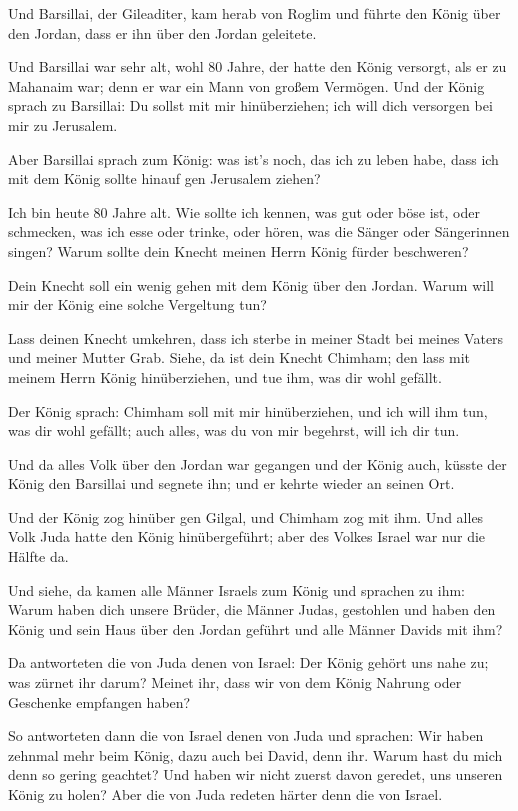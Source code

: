 Und Barsillai, der Gileaditer, kam herab von Roglim und
führte den König über den Jordan, dass er ihn über den Jordan geleitete.

 Und Barsillai war sehr alt, wohl 80 Jahre, der hatte den
König versorgt, als er zu Mahanaim war; denn er war ein Mann von großem
Vermögen.  Und der König sprach zu Barsillai: Du sollst
mit mir hinüberziehen; ich will dich versorgen bei mir zu Jerusalem.

 Aber Barsillai sprach zum König: was ist's noch, das ich
zu leben habe, dass ich mit dem König sollte hinauf gen Jerusalem
ziehen?

 Ich bin heute 80 Jahre alt. Wie sollte ich kennen, was
gut oder böse ist, oder schmecken, was ich esse oder trinke, oder hören,
was die Sänger oder Sängerinnen singen? Warum sollte dein Knecht meinen
Herrn König fürder beschweren?

 Dein Knecht soll ein wenig gehen mit dem König über den
Jordan. Warum will mir der König eine solche Vergeltung tun?

 Lass deinen Knecht umkehren, dass ich sterbe in meiner
Stadt bei meines Vaters und meiner Mutter Grab. Siehe, da ist dein
Knecht Chimham; den lass mit meinem Herrn König hinüberziehen, und tue
ihm, was dir wohl gefällt.

 Der König sprach: Chimham soll mit mir hinüberziehen,
und ich will ihm tun, was dir wohl gefällt; auch alles, was du von mir
begehrst, will ich dir tun.

 Und da alles Volk über den Jordan war gegangen und der
König auch, küsste der König den Barsillai und segnete ihn; und er
kehrte wieder an seinen Ort.

 Und der König zog hinüber gen Gilgal, und Chimham zog
mit ihm. Und alles Volk Juda hatte den König hinübergeführt; aber des
Volkes Israel war nur die Hälfte da.

 Und siehe, da kamen alle Männer Israels zum König und
sprachen zu ihm: Warum haben dich unsere Brüder, die Männer Judas,
gestohlen und haben den König und sein Haus über den Jordan geführt und
alle Männer Davids mit ihm?

 Da antworteten die von Juda denen von Israel: Der König
gehört uns nahe zu; was zürnet ihr darum? Meinet ihr, dass wir von dem
König Nahrung oder Geschenke empfangen haben?

 So antworteten dann die von Israel denen von Juda und
sprachen: Wir haben zehnmal mehr beim König, dazu auch bei David, denn
ihr. Warum hast du mich denn so gering geachtet? Und haben wir nicht
zuerst davon geredet, uns unseren König zu holen? Aber die von Juda
redeten härter denn die von Israel.

